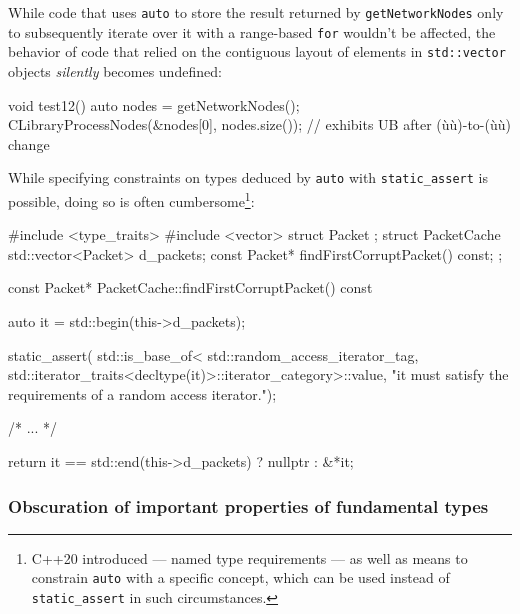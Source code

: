\noindent While code that uses \lstinline!auto! to store the result returned by
\lstinline!getNetworkNodes! only to subsequently iterate over it with a
range-based \lstinline!for! wouldn't be affected, the behavior of code that
relied on the contiguous layout of elements in \lstinline!std::vector!
objects \emph{silently} becomes undefined:

\begin{emcppslisting}[emcppsbatch=e18]
void test12()
{
    auto nodes = getNetworkNodes();
    CLibraryProcessNodes(&nodes[0], nodes.size());  
        // exhibits UB after (ù{}ù)-to-(ù{}ù) change
}
\end{emcppslisting}
    
\noindent While specifying constraints on types deduced by
\lstinline!auto! with \lstinline!static_assert! is possible, doing so is often
cumbersome{\cprotect\footnote{C++20 introduced  ---
named type requirements --- as well as means to constrain
\lstinline!auto! with a specific concept, which can be used instead of
  \lstinline!static_assert! in such circumstances.}}:

\begin{emcppshiddenlisting}[emcppsbatch=e19]
#include <type_traits>
#include <vector>
struct Packet {};
struct PacketCache {
    std::vector<Packet> d_packets;
    const Packet* findFirstCorruptPacket() const;
};
\end{emcppshiddenlisting}
\begin{emcppslisting}[emcppsbatch=e19]
const Packet* PacketCache::findFirstCorruptPacket() const
{
    auto it = std::begin(this->d_packets);

    static_assert(
        std::is_base_of<
            std::random_access_iterator_tag,
            std::iterator_traits<decltype(it)>::iterator_category>::value,
        "it must satisfy the requirements of a random access iterator.");

    /* ... */

    return it == std::end(this->d_packets) ? nullptr : &*it;
}
\end{emcppslisting}
    

\subsubsection[Obscuration of important properties of fundamental types]{Obscuration of important properties of fundamental types}\label{obscuration-of-important-properties-of-fundamental-types}

